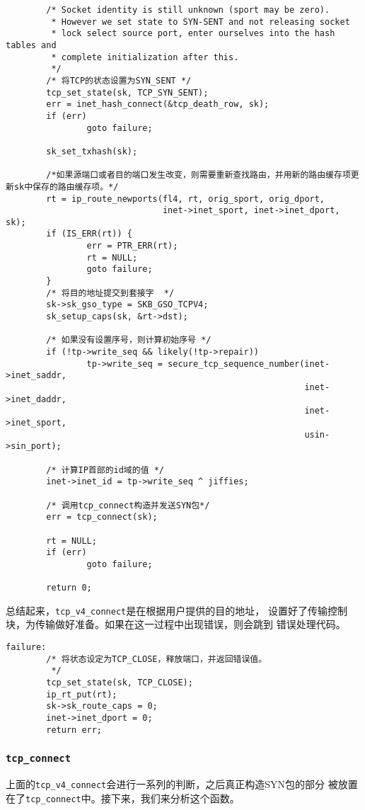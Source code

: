 \begin{verbatim}
        /* Socket identity is still unknown (sport may be zero).
         * However we set state to SYN-SENT and not releasing socket
         * lock select source port, enter ourselves into the hash tables and
         * complete initialization after this.
         */
        /* 将TCP的状态设置为SYN_SENT */
        tcp_set_state(sk, TCP_SYN_SENT);
        err = inet_hash_connect(&tcp_death_row, sk);
        if (err)
                goto failure;

        sk_set_txhash(sk);

		/*如果源端口或者目的端口发生改变，则需要重新查找路由，并用新的路由缓存项更新sk中保存的路由缓存项。*/
        rt = ip_route_newports(fl4, rt, orig_sport, orig_dport,
                               inet->inet_sport, inet->inet_dport, sk);
        if (IS_ERR(rt)) {
                err = PTR_ERR(rt);
                rt = NULL;
                goto failure;
        }
        /* 将目的地址提交到套接字  */
        sk->sk_gso_type = SKB_GSO_TCPV4;
        sk_setup_caps(sk, &rt->dst);

        /* 如果没有设置序号，则计算初始序号 */
        if (!tp->write_seq && likely(!tp->repair))
                tp->write_seq = secure_tcp_sequence_number(inet->inet_saddr,
                                                           inet->inet_daddr,
                                                           inet->inet_sport,
                                                           usin->sin_port);
                                                           
        /* 计算IP首部的id域的值 */
        inet->inet_id = tp->write_seq ^ jiffies;

        /* 调用tcp_connect构造并发送SYN包*/
        err = tcp_connect(sk);

        rt = NULL;
        if (err)
                goto failure;

        return 0;
\end{verbatim}

			总结起来，\texttt{tcp_v4_connect}是在根据用户提供的目的地址，
			设置好了传输控制块，为传输做好准备。如果在这一过程中出现错误，则会跳到
			错误处理代码。
\begin{verbatim}
failure:
        /* 将状态设定为TCP_CLOSE，释放端口，并返回错误值。
         */
        tcp_set_state(sk, TCP_CLOSE);
        ip_rt_put(rt);
        sk->sk_route_caps = 0;
        inet->inet_dport = 0;
        return err;
\end{verbatim}

		\subsubsection{\texttt{tcp_connect}}
			上面的\texttt{tcp_v4_connect}会进行一系列的判断，之后真正构造SYN包的部分
			被放置在了\texttt{tcp_connect}中。接下来，我们来分析这个函数。

